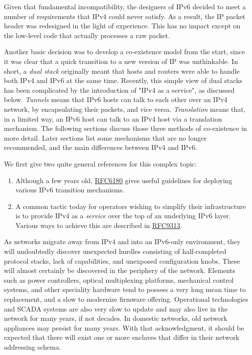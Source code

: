 \documentclass[
]{article}
\begin{document}
Given that fundamental incompatibility, the designers of IPv6 decided to
meet a number of requirements that IPv4 could never satisfy. As a
result, the IP packet header was redesigned in the light of experience.
This has no impact except on the low-level code that actually processes
a raw packet.

Another basic decision was to develop a co-existence model from the
start, since it was clear that a quick transition to a new version of IP
was unthinkable. In short, a \emph{dual stack} originally meant that
hosts and routers were able to handle both IPv4 and IPv6 at the same
time. Recently, this simple view of dual stacks has been complicated by
the introduction of "IPv4 as a service", as discussed below.
\emph{Tunnels} means that IPv6 hosts can talk to each other over an IPv4
network, by encapsulating their packets, and vice versa.
\emph{Translation} means that, in a limited way, an IPv6 host can talk
to an IPv4 host via a translation mechanism. The following sections
discuss those three methods of co-existence in more detail. Later
sections list some mechanisms that are no longer recommended, and the
main differences between IPv4 and IPv6.

We first give two quite general references for this complex topic:

\begin{enumerate}
\def\labelenumi{\arabic{enumi}.}
\item
  Although a few years old,
  \href{https://www.rfc-editor.org/info/rfc6180}{RFC6180} gives useful
  guidelines for deploying various IPv6 transition mechanisms.
\item
  A common tactic today for operators wishing to simplify their
  infrastructure is to provide IPv4 as a \emph{service} over the top of
  an underlying IPv6 layer. Various ways to achieve this are described
  in \href{https://www.rfc-editor.org/info/rfc9313}{RFC9313}.
\end{enumerate}

As networks migrate away from IPv4 and into an IPv6-only environment,
they will undoubtedly discover unexpected hurdles consisting of
half-completed protocol stacks, lack of capabilities, and unexposed
configuration knobs. These will almost certainly be discovered in the
periphery of the network. Elements such as power controllers, optical
multiplexing platforms, mechanical control systems, and other speciality
hardware tend to possess a very long mean time to replacement, and a
slow to modernize firmware offering. Operational technologies and SCADA
systems are also very slow to update and may also live in the network
for many years, if not decades. In domestic networks, old network
appliances may persist for many years. With that acknowledgment, it
should be expected that there will exist one or more enclaves that
differ in their network addressing schema.
\end{document}
